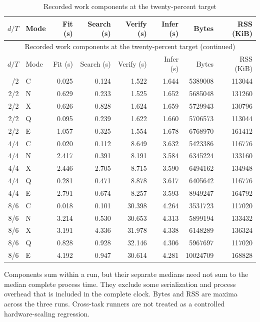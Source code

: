\begingroup\small\setlength{\tabcolsep}{3pt}
\begin{longtable}{rlrrrrrr}
\caption{Recorded work components at the twenty-percent target}\label{tab:components57}\\
\hline
$d/T$ & Mode & Fit (s) & Search (s) & Verify (s) & Infer (s) & Bytes & RSS (KiB) \\
\hline
\endfirsthead
\multicolumn{8}{c}{Recorded work components at the twenty-percent target (continued)}\\
\hline
$d/T$ & Mode & Fit (s) & Search (s) & Verify (s) & Infer (s) & Bytes & RSS (KiB) \\
\hline
\endhead
\hline
\endfoot
2/2 & C & 0.025 & 0.124 & 1.522 & 1.644 & 5389008 & 113044 \\
2/2 & N & 0.629 & 0.233 & 1.525 & 1.652 & 5685048 & 131260 \\
2/2 & X & 0.626 & 0.828 & 1.624 & 1.659 & 5729943 & 130796 \\
2/2 & Q & 0.095 & 0.239 & 1.622 & 1.660 & 5706573 & 113044 \\
2/2 & E & 1.057 & 0.325 & 1.554 & 1.678 & 6768970 & 161412 \\
4/4 & C & 0.020 & 0.112 & 8.649 & 3.632 & 5423386 & 116776 \\
4/4 & N & 2.417 & 0.391 & 8.191 & 3.584 & 6345224 & 133160 \\
4/4 & X & 2.446 & 2.705 & 8.715 & 3.590 & 6494162 & 134948 \\
4/4 & Q & 0.281 & 0.471 & 8.878 & 3.617 & 6405642 & 116776 \\
4/4 & E & 2.791 & 0.674 & 8.257 & 3.593 & 8949247 & 164792 \\
8/6 & C & 0.018 & 0.101 & 30.398 & 4.264 & 3531723 & 117020 \\
8/6 & N & 3.214 & 0.530 & 30.653 & 4.313 & 5899194 & 133432 \\
8/6 & X & 3.191 & 4.336 & 31.978 & 4.338 & 6148289 & 136324 \\
8/6 & Q & 0.828 & 0.928 & 32.146 & 4.306 & 5967697 & 117020 \\
8/6 & E & 4.192 & 0.947 & 30.614 & 4.281 & 10024709 & 168828 \\
\end{longtable}
\endgroup
{\footnotesize Components sum within a run, but their separate medians need not sum to the median complete process time. They exclude some serialization and process overhead that is included in the complete clock. Bytes and RSS are maxima across the three runs. Cross-task runners are not treated as a controlled hardware-scaling regression.}
